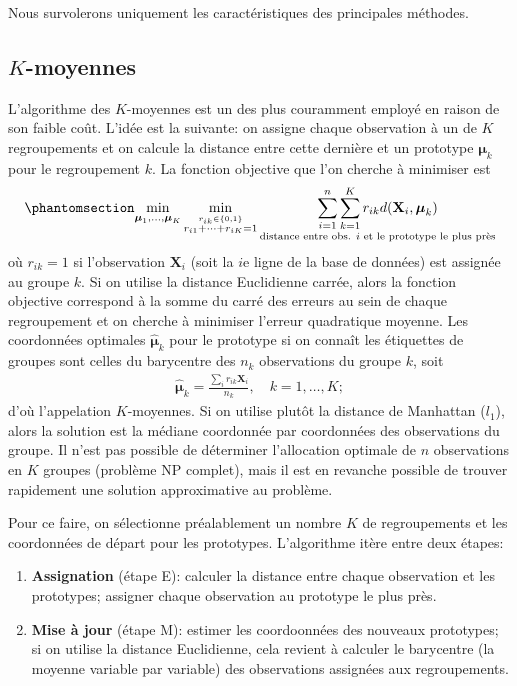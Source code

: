 \documentclass[
  11pt,
  letterpaper,
]{scrbook}
\providecommand{\tightlist}{%
  \setlength{\itemsep}{0pt}\setlength{\parskip}{0pt}}\usepackage{longtable,booktabs,array}
\theoremstyle{definition}
\theoremstyle{remark}
\begin{document}
Nous survolerons uniquement les caractéristiques des principales
méthodes.

\subsection{\texorpdfstring{\(K\)-moyennes}{K-moyennes}}\label{k-moyennes}

L'algorithme des \(K\)-moyennes est un des plus couramment employé en
raison de son faible coût. L'idée est la suivante: on assigne chaque
observation à un de \(K\) regroupements et on calcule la distance entre
cette dernière et un prototype \(\boldsymbol{\mu}_k\) pour le
regroupement \(k\). La fonction objective que l'on cherche à minimiser
est \begin{equation}\phantomsection\label{eq-fobjKmoy}{
\min_{\boldsymbol{\mu}_1, \ldots, \boldsymbol{\mu}_K}\min_{\stackrel{r_{ik} \in \{0, 1\}}{r_{i1} + \cdots + r_{iK}=1}}\underset{\text{distance entre obs. $i$ et le prototype le plus près}}{\sum_{i=1}^n \sum_{k=1}^K r_{ik}d(\mathbf{X}_i,  \boldsymbol{\mu}_{k})}
}\end{equation} où \(r_{ik}=1\) si l'observation \(\mathbf{X}_i\) (soit
la \(i\)e ligne de la base de données) est assignée au groupe \(k\). Si
on utilise la distance Euclidienne carrée, alors la fonction objective
correspond à la somme du carré des erreurs au sein de chaque
regroupement et on cherche à minimiser l'erreur quadratique moyenne. Les
coordonnées optimales \(\widehat{\boldsymbol{\mu}}_k\) pour le prototype
si on connaît les étiquettes de groupes sont celles du barycentre des
\(n_k\) observations du groupe \(k\), soit \begin{align*}
\widehat{\boldsymbol{\mu}}_k = \frac{\sum_{i} r_{ik} \mathbf{X}_i}{n_k}, \quad k = 1, \ldots, K;
\end{align*} d'où l'appelation \(K\)-moyennes. Si on utilise plutôt la
distance de Manhattan (\(l_1\)), alors la solution est la médiane
coordonnée par coordonnées des observations du groupe. Il n'est pas
possible de déterminer l'allocation optimale de \(n\) observations en
\(K\) groupes (problème NP complet), mais il est en revanche possible de
trouver rapidement une solution approximative au problème.

Pour ce faire, on sélectionne préalablement un nombre \(K\) de
regroupements et les coordonnées de départ pour les prototypes.
L'algorithme itère entre deux étapes:

\begin{enumerate}
\def\labelenumi{\arabic{enumi}.}
\tightlist
\item
  \textbf{Assignation} (étape E): calculer la distance entre chaque
  observation et les prototypes; assigner chaque observation au
  prototype le plus près.
\item
  \textbf{Mise à jour} (étape M): estimer les coordoonnées des nouveaux
  prototypes; si on utilise la distance Euclidienne, cela revient à
  calculer le barycentre (la moyenne variable par variable) des
  observations assignées aux regroupements.
\end{enumerate}
\end{document}
